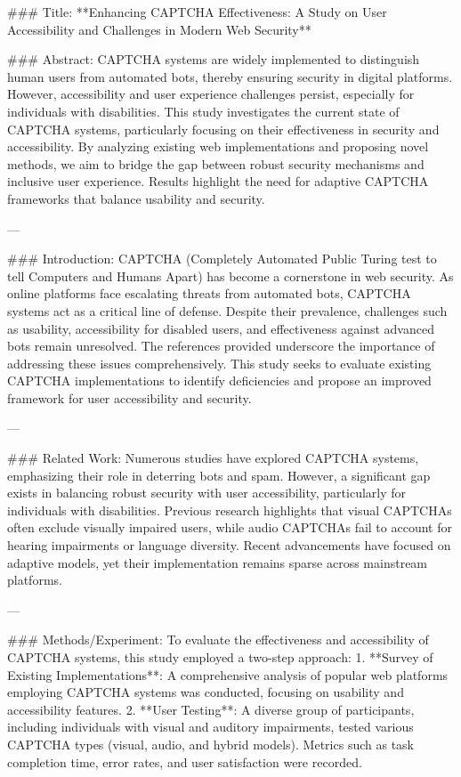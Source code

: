 ### Title:
**Enhancing CAPTCHA Effectiveness: A Study on User Accessibility and Challenges in Modern Web Security**

### Abstract:
CAPTCHA systems are widely implemented to distinguish human users from automated bots, thereby ensuring security in digital platforms. However, accessibility and user experience challenges persist, especially for individuals with disabilities. This study investigates the current state of CAPTCHA systems, particularly focusing on their effectiveness in security and accessibility. By analyzing existing web implementations and proposing novel methods, we aim to bridge the gap between robust security mechanisms and inclusive user experience. Results highlight the need for adaptive CAPTCHA frameworks that balance usability and security.

---

### Introduction:
CAPTCHA (Completely Automated Public Turing test to tell Computers and Humans Apart) has become a cornerstone in web security. As online platforms face escalating threats from automated bots, CAPTCHA systems act as a critical line of defense. Despite their prevalence, challenges such as usability, accessibility for disabled users, and effectiveness against advanced bots remain unresolved. The references provided underscore the importance of addressing these issues comprehensively. This study seeks to evaluate existing CAPTCHA implementations to identify deficiencies and propose an improved framework for user accessibility and security.

---

### Related Work:
Numerous studies have explored CAPTCHA systems, emphasizing their role in deterring bots and spam. However, a significant gap exists in balancing robust security with user accessibility, particularly for individuals with disabilities. Previous research highlights that visual CAPTCHAs often exclude visually impaired users, while audio CAPTCHAs fail to account for hearing impairments or language diversity. Recent advancements have focused on adaptive models, yet their implementation remains sparse across mainstream platforms.

---

### Methods/Experiment:
To evaluate the effectiveness and accessibility of CAPTCHA systems, this study employed a two-step approach:
1. **Survey of Existing Implementations**: A comprehensive analysis of popular web platforms employing CAPTCHA systems was conducted, focusing on usability and accessibility features.
2. **User Testing**: A diverse group of participants, including individuals with visual and auditory impairments, tested various CAPTCHA types (visual, audio, and hybrid models). Metrics such as task completion time, error rates, and user satisfaction were recorded.

